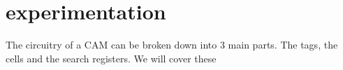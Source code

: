 \section{experimentation}
The circuitry of a CAM can be broken down into 3 main parts. The tags, the cells and the search registers. We will cover these 

